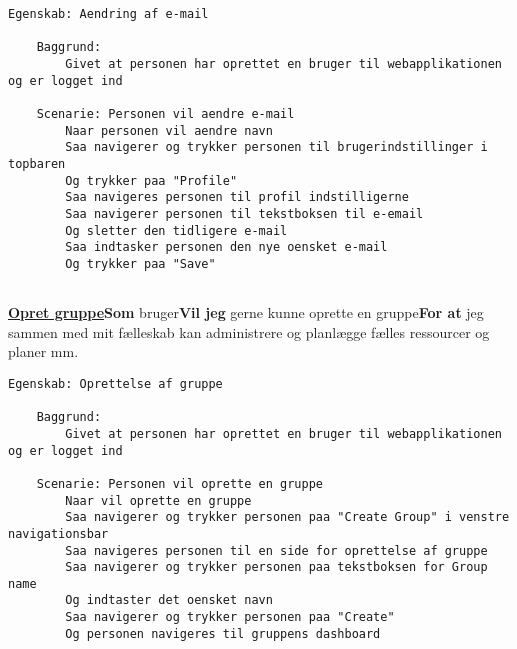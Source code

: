\begin{lstlisting}[language=Gherkin]
Egenskab: Aendring af e-mail

    Baggrund:
        Givet at personen har oprettet en bruger til webapplikationen og er logget ind
        
    Scenarie: Personen vil aendre e-mail
        Naar personen vil aendre navn
        Saa navigerer og trykker personen til brugerindstillinger i topbaren
        Og trykker paa "Profile"
        Saa navigeres personen til profil indstilligerne
        Saa navigerer personen til tekstboksen til e-email
        Og sletter den tidligere e-mail
        Saa indtasker personen den nye oensket e-mail
        Og trykker paa "Save"
        

\end{lstlisting}


\noindent\textbf{\underline{Opret gruppe}}\newline \textbf{Som} bruger\newline \textbf{Vil jeg} gerne kunne oprette en gruppe\newline \textbf{For at} jeg sammen med mit fælleskab kan administrere og planlægge fælles ressourcer og planer mm.

\begin{lstlisting}[language=Gherkin]
Egenskab: Oprettelse af gruppe

    Baggrund:
        Givet at personen har oprettet en bruger til webapplikationen og er logget ind
        
    Scenarie: Personen vil oprette en gruppe
        Naar vil oprette en gruppe
        Saa navigerer og trykker personen paa "Create Group" i venstre navigationsbar
        Saa navigeres personen til en side for oprettelse af gruppe
        Saa navigerer og trykker personen paa tekstboksen for Group name
        Og indtaster det oensket navn
        Saa navigerer og trykker personen paa "Create"
        Og personen navigeres til gruppens dashboard

\end{lstlisting}